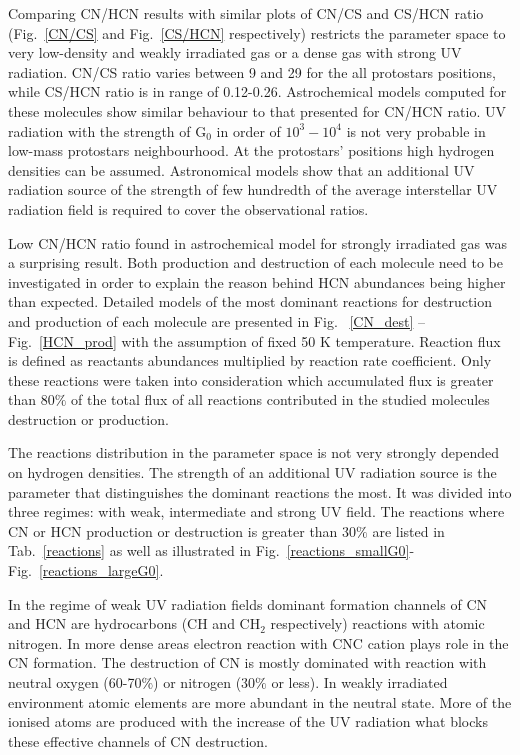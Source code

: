 \documentclass{aa}
\begin{document}
Comparing CN/HCN results with similar plots of CN/CS and CS/HCN ratio (Fig.~\ref{CN/CS} and Fig.~\ref{CS/HCN} respectively) restricts the parameter space to very low-density and weakly irradiated gas or a dense gas with strong UV radiation. CN/CS ratio varies between 9 and 29 for the all protostars positions, while CS/HCN ratio is in range of 0.12-0.26. Astrochemical models computed for these molecules show similar behaviour to that presented for CN/HCN ratio. UV radiation with the strength of G$_0$ in order of $10^{3}-10^{4}$ is not very probable in low-mass protostars neighbourhood. At the protostars' positions high hydrogen densities can be assumed. Astronomical models show that an additional UV radiation source of the strength of few hundredth of the average interstellar UV radiation field is required to cover the observational ratios.

Low CN/HCN ratio found in astrochemical model for strongly irradiated gas was a surprising result. Both production and destruction of each molecule need to be investigated in order to explain the reason behind HCN abundances being higher than expected. Detailed models of the most dominant reactions for destruction and production of each molecule are presented in Fig. ~\ref{CN_dest} – Fig.~\ref{HCN_prod} with the assumption of fixed 50 K temperature. Reaction flux is defined as reactants abundances multiplied by reaction rate coefficient. Only these reactions were taken into consideration which accumulated flux is greater than 80$\%$ of the total flux of all reactions contributed in the studied molecules destruction or production. 

The reactions distribution in the parameter space is not very strongly depended on hydrogen densities. The strength of an additional UV radiation source is the parameter that distinguishes the dominant reactions the most. It was divided into three regimes: with weak, intermediate and strong UV field. The reactions where CN or HCN production or destruction is greater than 30$\%$ are listed in Tab.~\ref{reactions} as well as illustrated in Fig.~\ref{reactions_smallG0}- Fig.~\ref{reactions_largeG0}.

In the regime of weak UV radiation fields dominant formation channels of CN and HCN are hydrocarbons (CH and CH$_2$ respectively) reactions with atomic nitrogen. In more dense areas electron reaction with CNC cation plays role in the CN formation. The destruction of CN is mostly dominated with reaction with neutral oxygen (60-70$\%$) or nitrogen (30$\%$ or less). In weakly irradiated environment atomic elements are more abundant in the neutral state. More of the ionised atoms are produced with the increase of the UV radiation what blocks these effective channels of CN destruction. 
\end{document}
